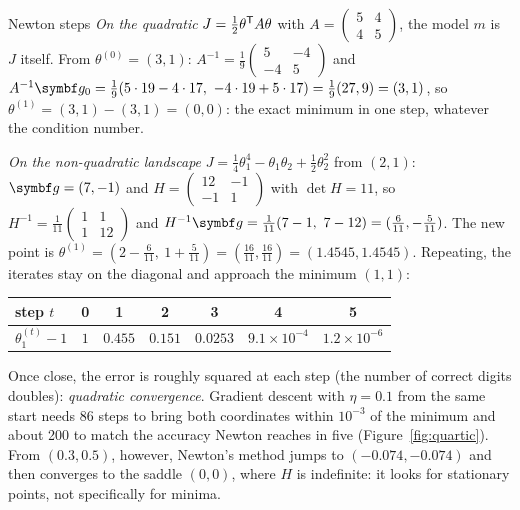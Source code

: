 \documentclass[11pt]{article}
\newcommand{\gvec}{\vect{g}}
\begin{document}
\begin{worked}{Newton steps}
\emph{On the quadratic} $J = \frac12\theta^{\mathsf{T}} A\theta$ with $A = \begin{pmatrix} 5 & 4 \\ 4 & 5\end{pmatrix}$, the model
$m$ is $J$ itself. From $\theta^{(0)} = (3, 1)$: $A^{-1} = \frac19\begin{pmatrix} 5 & -4 \\ -4 & 5\end{pmatrix}$ and
$A^{-1}\gvec_0 = \frac19(5 \cdot 19 - 4 \cdot 17,\ -4 \cdot 19 + 5 \cdot 17) = \frac19(27, 9) = (3, 1)$, so
$\theta^{(1)} = (3, 1) - (3, 1) = (0, 0)$: the exact minimum in one step, whatever the condition number.

\emph{On the non-quadratic landscape} $J = \frac14\theta_1^4 - \theta_1\theta_2 + \frac12\theta_2^2$ from $(2, 1)$:
$\gvec = (7, -1)$ and $H = \begin{pmatrix} 12 & -1 \\ -1 & 1\end{pmatrix}$ with $\det H = 11$, so
$H^{-1} = \frac1{11}\begin{pmatrix} 1 & 1 \\ 1 & 12\end{pmatrix}$ and
$H^{-1}\gvec = \frac1{11}(7 - 1,\ 7 - 12) = (\frac6{11}, -\frac5{11})$. The new point is
$\theta^{(1)} = (2 - \frac6{11},\ 1 + \frac5{11}) = (\frac{16}{11}, \frac{16}{11}) = (1.4545, 1.4545)$. Repeating, the
iterates stay on the diagonal and approach the minimum $(1, 1)$:
\begin{center}\small
\begin{tabular}{@{}lcccccc@{}}
\toprule
step $t$ & 0 & 1 & 2 & 3 & 4 & 5 \\
\midrule
$\theta^{(t)}_1 - 1$ & $1$ & $0.455$ & $0.151$ & $0.0253$ & $9.1 \times 10^{-4}$ & $1.2 \times 10^{-6}$ \\
\bottomrule
\end{tabular}
\end{center}
Once close, the error is roughly squared at each step (the number of correct digits doubles): \emph{quadratic
convergence}. Gradient descent with $\eta = 0.1$ from the same start needs 86 steps to bring both coordinates
within $10^{-3}$ of the minimum and about 200 to match the accuracy Newton reaches in five (Figure~\ref{fig:quartic}). From $(0.3, 0.5)$, however, Newton's method jumps to $(-0.074, -0.074)$ and then converges
to the saddle $(0, 0)$, where $H$ is indefinite: it looks for stationary points, not specifically for minima.
\end{worked}
\end{document}
